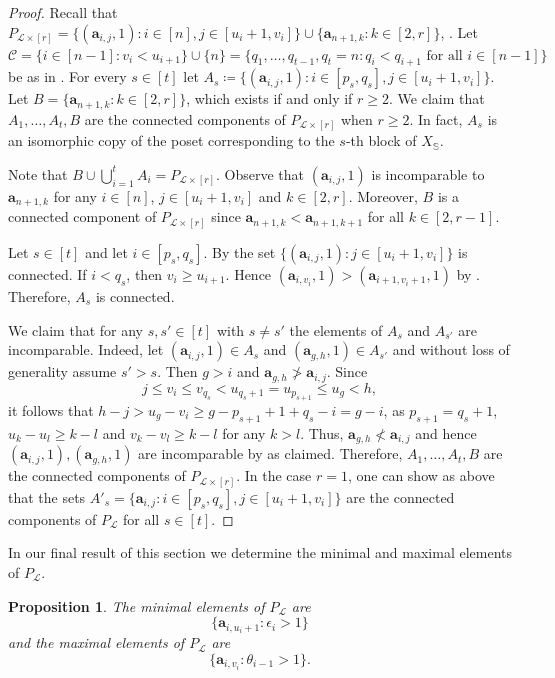 \documentclass[11pt,a4paper,reqno,dvipsnames]{amsart}
\theoremstyle{plain}
\newtheorem{Proposition}[Theorem]{Proposition}
\theoremstyle{definition}
\newtheorem{Assumptions and Discussion}[Theorem]{Assumptions and Discussion}
\theoremstyle{remark}
\newcommand\bda{{\bm a}}
\newcommand\calC{\mathcal{C}}
\newcommand\calL{\mathcal{L}}
\newcommand{\Lr}{\ensuremath{\calL\times[r]}}
\begin{document}
\begin{proof}
Recall that  $P_{\Lr} = \{(\bda_{i,j},1): i\in[n],  j\in[u_i+1, v_i]\}\cup \{\bda_{n+1,k}: k\in [2,r]\}$, .  Let $\calC=\{i\in [n-1]: v_i<u_{i+1}\} \cup \{n\}=\{q_1, \ldots, q_{t-1}, q_t=n: q_{i}<q_{i+1} \text{ for all } i\in[n-1]\}$ be as in . For every $s\in [t]$ let $A_s\coloneq\{(\bda_{i,j},1): i\in [p_s,q_s], j\in[u_i+1,v_i]\}$. 
Let $B=\{\bda_{n+1,k}:k\in[2,r]\}$, which exists if and only if $r\ge 2$. We claim that $A_1, \ldots, A_t, B$ are the connected components of $P_{\Lr}$ when $r\ge 2$. 
In fact, $A_s$ is an isomorphic copy of the poset corresponding to the $s$-th block of $X_{\mathbb{S}}$.

Note that $B\cup \bigcup_{i=1}^t A_i=P_{\Lr}$. 
Observe that $(\bda_{i,j},1)$ is incomparable to $\bda_{n+1,k}$ for any $i\in [n]$, $j\in [u_i+1,v_i]$ and $k\in [2,r]$. Moreover, $B$ is  a connected component of $P_{\Lr}$ since $\bda_{n+1,k}<\bda_{n+1,k+1}$ for all $k\in [2,r-1]$.

 Let $s\in [t]$ and let $i\in [p_s,q_s]$. By  the set $\{(\bda_{i,j},1): j\in [u_i+1,v_i]\}$ is connected. If $i<q_s$, then  
$v_i\ge u_{i+1}$. Hence $(\bda_{i,v_i},1)>(\bda_{i+1,v_i+1},1)$ by . Therefore, $A_s$ is connected.


 

We claim that for any $s, s'\in [t]$ with $s\neq s'$ the elements of $A_s$ and $A_{s'}$ are incomparable. Indeed, let $(\bda_{i,j},1)\in A_s$ and $(\bda_{g,h},1)\in A_{s'}$ and without loss of generality assume $s'>s$. Then $g>i$ and $\bda_{g,h} \not> \bda_{i,j}$. Since 
$$j\le v_i\le v_{q_s}<u_{q_s+1}=u_{p_{s+1}} \le u_g<h,$$ 
it follows that $h-j>u_g-v_i\ge g-p_{s+1}+1+q_s-i=g-i$, as $p_{s+1}=q_s+1$, $u_{k}-u_l\ge k-l$ and $v_k-v_l\ge k-l$ for any $k>l$. Thus,  $\bda_{g,h}\not<\bda_{i,j}$ and hence $ (\bda_{i,j},1), (\bda_{g,h},1)$ are incomparable by  as claimed. Therefore, $A_1, \ldots, A_t, B$ are the connected components of $P_{\Lr}$. In the case $r=1$, one can show as above that the sets $A'_s=\{\bda_{i,j}: i\in [p_s, q_s] ,j\in [u_i+1,v_i] \}$ are the connected components of $P_{\calL}$ for all $s\in [t]$.
\end{proof}


In our final result of this section we determine the minimal and maximal elements of $P_{\calL}$.

\begin{Proposition}\label{lem:beginning and end}
 The minimal elements of $P_{\calL}$ are $$\{\bda_{i,u_i+1}: \epsilon_{i}>1\}$$  
    and the maximal elements of $P_{\calL}$ are 
    $$\{\bda_{i, v_i}: \theta_{i-1}>1\}.$$
\end{Proposition}
\end{document}
